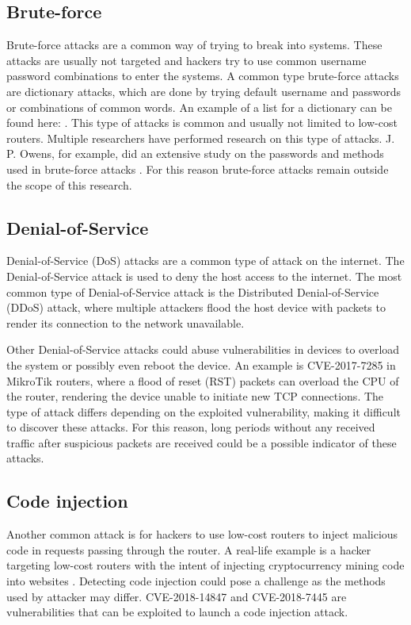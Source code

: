 \subsection{Brute-force}
Brute-force attacks are a common way of trying to break into systems. These attacks are usually not targeted and hackers try to use common username password combinations to enter the systems. A common  type brute-force attacks are dictionary attacks, which are done by trying default username and passwords or combinations of common words. An example of a list for a dictionary can be found here: \cite{GITHUB:SECLISTS}. This type of attacks is common and usually not limited to low-cost routers. Multiple researchers have performed research on this type of attacks. J. P. Owens, for example, did an extensive study on the passwords and methods used in brute-force attacks \cite{BRUTEFORCE:CLARCKSON:2008}. For this reason brute-force attacks remain outside the scope of this research.

\subsection{Denial-of-Service}
Denial-of-Service (DoS) attacks are a common type of attack on the internet. The Denial-of-Service attack is used to deny the host access to the internet. The most common type of Denial-of-Service attack is the Distributed Denial-of-Service (DDoS) attack, where multiple attackers flood the host device with packets to render its connection to the network unavailable.

Other Denial-of-Service attacks could abuse vulnerabilities in devices to overload the system or possibly even reboot the device. An example is CVE-2017-7285 \cite{CVE-2017-7285:CXSECURIITY:2017} in MikroTik routers, where a flood of reset (RST) packets can overload the CPU of the router, rendering the device unable to initiate new TCP connections. The type of attack differs depending on the exploited vulnerability, making it difficult to discover these attacks. For this reason, long periods without any received traffic after suspicious packets are received could be a possible indicator of these attacks.

\subsection{Code injection}
Another common attack is for hackers to use low-cost routers to inject malicious code in requests passing through the router. A real-life example is a hacker targeting low-cost routers with the intent of injecting cryptocurrency mining code into websites \cite{MikroTikCryptoHack:PCMAG:2018}. Detecting code injection could pose a challenge as the methods used by attacker may differ. CVE-2018-14847 \cite{CVE-2018-14847:TENABLE:2018} and CVE-2018-7445 \cite{CVE-2018-7445:CORESEC:2018} are vulnerabilities that can be exploited to launch a code injection attack.

